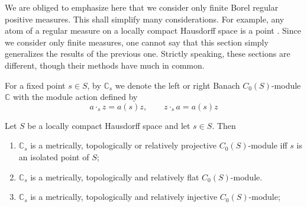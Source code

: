 We are obliged to emphasize here that we consider only finite Borel regular positive
measures. This shall simplify many considerations. For example, any atom of a 
regular measure on a locally compact Hausdorff space is a point
\cite[chapter 5, \S 5, exercise 7]{BourbElemMathIntegLivVI}. Since we consider
only finite measures, one cannot say that this section simply generalizes
the results of the previous one. Strictly speaking, these sections are different,
though their methods have much in common.

For a fixed point $s\in S$, by $\mathbb{C}_s$ we denote the left or right Banach
$C_0(S)$-module $\mathbb{C}$ with the module action defined by
\[
a\cdot_s z=a(s)z,\qquad z\cdot_s a=a(s)z
\]
\begin{proposition}\label{OneDimC0SModMetTopRelProjIngFlat} Let $S$ be a locally
compact Hausdorff space and let $s\in S$. Then 

\begin{enumerate}[label = (\roman*)]
    \item $\mathbb{C}_s$ is a metrically, topologically or relatively projective 
    $C_0(S)$-module iff $s$ is an isolated point of $S$;

    \item $\mathbb{C}_s$ is a metrically, topologically and relatively flat 
    $C_0(S)$-module.

    \item $\mathbb{C}_s$ is a metrically, topologically and relatively injective 
    $C_0(S)$-module;

\end{enumerate}
\end{proposition}
